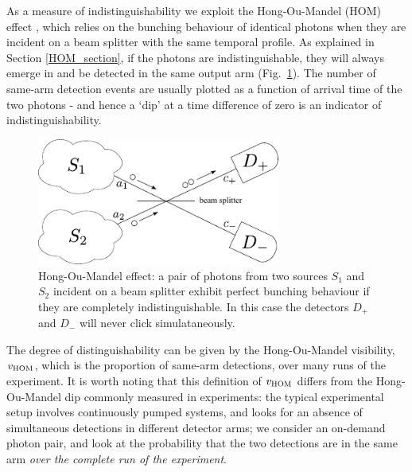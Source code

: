 As a measure of indistinguishability we exploit the Hong-Ou-Mandel (HOM) effect \cite{HOM}, which relies on the bunching behaviour of identical photons when they are incident on a beam splitter with the same temporal profile. As explained in Section \ref{HOM_section}, if the photons are indistinguishable, they will always emerge in and be detected in the same output arm (Fig.~\ref{HOM_expt}). The number of same-arm detection events are usually plotted as a function of arrival time of the two photons - and hence a `dip' at a time difference of zero is an indicator of indistinguishability.
\begin{figure}[htb]
  \begin{center}
  \includegraphics[width=8cm]{assets/HOM_expt.pdf}
  \end{center}
  \caption{Hong-Ou-Mandel effect: a pair of photons from two sources $S_1$ and $S_2$ incident on a beam splitter exhibit perfect bunching behaviour if they are completely indistinguishable. In this case the detectors  $D_+$ and $D_-$ will never click simulataneously.}
  \label{HOM_expt}
\end{figure}
The degree of distinguishability can be given by the Hong-Ou-Mandel visibility, $v_{\rm HOM}$, which is the proportion of same-arm detections, over many runs of the experiment. It is worth noting that this definition of $v_{\rm HOM}$ differs from the Hong-Ou-Mandel dip commonly measured in experiments: the typical experimental setup involves continuously pumped systems, and looks for an absence of simultaneous detections in different detector arms; we consider an on-demand photon pair, and look at the probability that the two detections are in the same arm \textit{over the complete run of the experiment}. 


